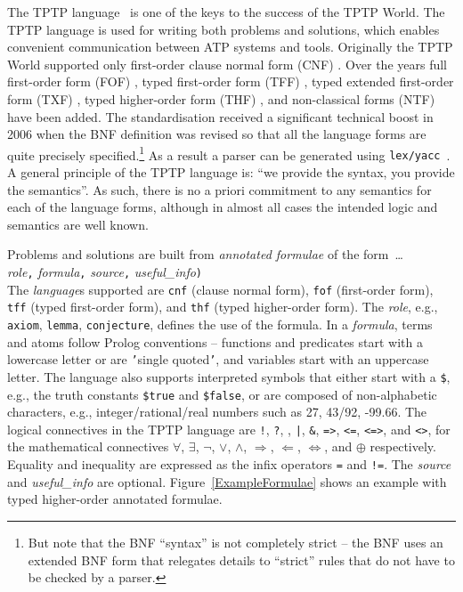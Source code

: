 \documentclass[runningheads]{llncs}
\newcommand{\smalltt}[1]{\small \texttt{#1}}
\begin{document}
The TPTP language~\cite{Sut23-IGPL} is one of the keys to the success of the TPTP World.
The TPTP language is used for writing both problems and solutions,
which enables convenient communication between ATP systems and tools.
Originally the TPTP World supported only first-order clause normal form (CNF)
\cite{SS98-JAR}.
Over the years full first-order form (FOF)
\cite{Sut09}, 
typed first-order form (TFF)
\cite{SS+12,BP13-TFF1}, 
typed extended first-order form (TXF)
\cite{SK18}, 
typed higher-order form (THF)
\cite{SB10,KSR16}, 
and non-classical forms (NTF)~\cite{SF+22} have been added.
The standardisation received a significant technical boost in 2006 when the BNF
definition was revised so that all the language forms are quite precisely specified.\footnote{%
But note that the BNF ``syntax'' is not completely strict -- the BNF uses an extended BNF form
that relegates details to ``strict'' rules that do not have to be checked by a parser.}
As a result a parser can be generated using {\tt lex/yacc}~\cite{VS06}.
A general principle of the TPTP language is: ``we provide the syntax, you provide the semantics''.
As such, there is no a priori commitment to any semantics for each of the language forms, 
although in almost all cases the intended logic and semantics are well known.

Problems and solutions are built from {\em annotated formulae} of the form~\ldots \\
{\em role}{\tt ,}
{\em formula}{\tt ,}
{\em source}{\tt ,}
{\em useful\_info}{\tt )}\\
The {\em language}s supported are {\smalltt{cnf}} (clause normal form), {\smalltt{fof}}
(first-order form), {\smalltt{tff}} (typed first-order form), and {\smalltt{thf}}
(typed higher-order form).
The {\em role}, e.g., {\smalltt{axiom}}, {\smalltt{lemma}}, {\smalltt{conjecture}}, defines the 
use of the formula.
In a {\em formula}, terms and atoms follow Prolog conventions -- functions and predicates start 
with a lowercase letter or are {\tt '}single quoted{\tt '}, and variables start with an uppercase 
letter.
The language also supports interpreted symbols that either start with a {\tt \$}, e.g., the 
truth constants {\smalltt{\$true}} and {\smalltt{\$false}}, or are composed of 
non-alphabetic characters, e.g., integer/rational/real numbers such as 27, 43/92, -99.66.
The logical connectives in the TPTP language are
{\tt !}, {\tt ?}, {\tt {\raisebox{0.4ex}{\texttildelow}}}, {\tt |}, {\tt \&}, {\tt =>}, {\tt <=},
{\tt <=>}, and {\tt <{\raisebox{0.4ex}{\texttildelow}}>},
for the mathematical connectives
$\forall$, $\exists$, $\neg$, $\vee$, $\wedge$, $\Rightarrow$, $\Leftarrow$, $\Leftrightarrow$, 
and $\oplus$ respectively.
Equality and inequality are expressed as the infix operators {\tt =} and {\tt !=}.
The {\em source} and {\em useful\_info} are optional.
Figure~\ref{ExampleFormulae} shows an example with typed higher-order annotated formulae.
\end{document}

